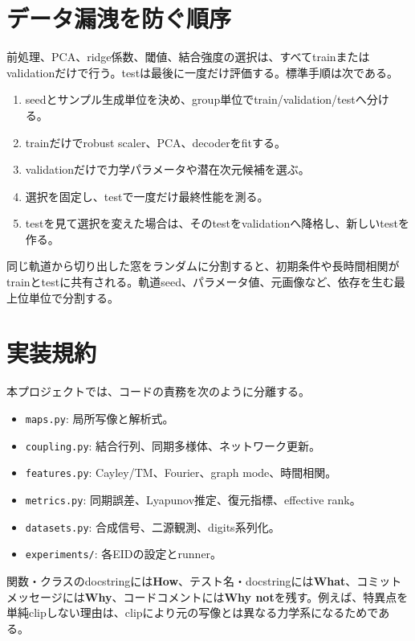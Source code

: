 \documentclass[a4paper,11pt,oneside,openany]{ltjsbook}
\newcommand{\code}[1]{\texttt{#1}}
\begin{document}
\section{データ漏洩を防ぐ順序}

前処理、PCA、ridge係数、閾値、結合強度の選択は、すべてtrainまたはvalidationだけで行う。testは最後に一度だけ評価する。標準手順は次である。

\begin{enumerate}
  \item seedとサンプル生成単位を決め、group単位でtrain/validation/testへ分ける。
  \item trainだけでrobust scaler、PCA、decoderをfitする。
  \item validationだけで力学パラメータや潜在次元候補を選ぶ。
  \item 選択を固定し、testで一度だけ最終性能を測る。
  \item testを見て選択を変えた場合は、そのtestをvalidationへ降格し、新しいtestを作る。
\end{enumerate}

\begin{cautionbox}
同じ軌道から切り出した窓をランダムに分割すると、初期条件や長時間相関がtrainとtestに共有される。軌道seed、パラメータ値、元画像など、依存を生む最上位単位で分割する。
\end{cautionbox}

\section{実装規約}

本プロジェクトでは、コードの責務を次のように分離する。

\begin{itemize}
  \item \code{maps.py}: 局所写像と解析式。
  \item \code{coupling.py}: 結合行列、同期多様体、ネットワーク更新。
  \item \code{features.py}: Cayley/TM、Fourier、graph mode、時間相関。
  \item \code{metrics.py}: 同期誤差、Lyapunov推定、復元指標、effective rank。
  \item \code{datasets.py}: 合成信号、二源観測、digits系列化。
  \item \code{experiments/}: 各EIDの設定とrunner。
\end{itemize}

関数・クラスのdocstringには\textbf{How}、テスト名・docstringには\textbf{What}、コミットメッセージには\textbf{Why}、コードコメントには\textbf{Why not}を残す。例えば、特異点を単純clipしない理由は、clipにより元の写像とは異なる力学系になるためである。
\end{document}
